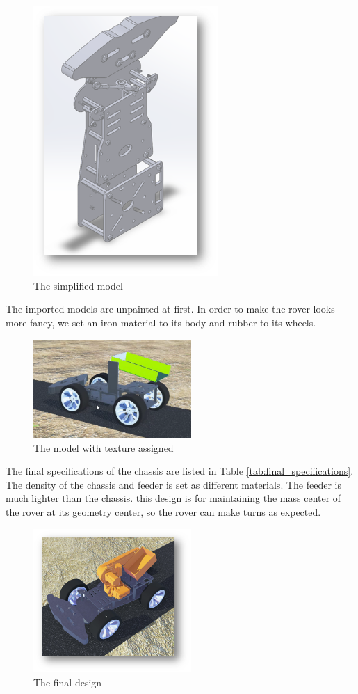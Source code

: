 \begin{figure}[htbp]
    \centering
    \includegraphics[width=7cm]{implementation/img_haotian/simplified_model.png}
    \caption{The simplified model}
    \label{fig:simplified_model}
\end{figure}


The imported models are unpainted at first. In order to make the rover looks more fancy, we set an iron material to its body and  rubber to its wheels.

\begin{figure}
    \centering
    \includegraphics[width=6cm]{implementation/img_haotian/texture_assigning.png}
    \caption{The model with texture assigned}
    \label{fig:texture}
\end{figure}


The final specifications of the chassis are listed in Table \ref{tab:final_specifications}. The density of the chassis and feeder is set as different materials. The feeder is much lighter than the chassis. this design is for maintaining the mass center of the rover at its geometry center, so the rover can make turns as expected.
\begin{figure}[htbp]
    \centering
    \includegraphics[width=6cm]{implementation/img_haotian/final_design.png}
    \caption{The final design}
    \label{fig:final_design}
\end{figure}

